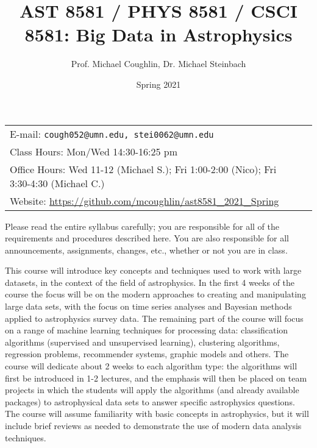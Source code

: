 \documentclass[12pt]{article}
\title{AST 8581 / PHYS 8581 / CSCI 8581: Big Data in Astrophysics}
\author{Prof. Michael Coughlin, Dr. Michael Steinbach}
\date{Spring 2021}
\newcommand{\blankline}{\quad\pagebreak[2]}
\begin{document}
\maketitle

\blankline



\begin{tabular*}{.90\textwidth}{lr}  %


E-mail: \texttt{cough052@umn.edu, stei0062@umn.edu} & \\ 
 Class Hours: Mon/Wed 14:30-16:25 pm \\
 Office Hours: Wed 11-12 (Michael S.); Fri 1:00-2:00 (Nico); Fri 3:30-4:30 (Michael C.) \\
 Website: \url{https://github.com/mcoughlin/ast8581_2021_Spring}

&  \\
\hline
\end{tabular*}

\vspace{5 mm}

\setlength{\parindent}{2em}
\setlength{\parskip}{0.6em}
\renewcommand{\baselinestretch}{1.2}


Please read the entire syllabus carefully; you are responsible for all of the requirements and procedures described here. You are also responsible for all announcements, assignments, changes, etc., whether or not you are in class. 

This course will introduce key concepts and techniques used to work with large datasets, in the
context of the field of astrophysics. In the first 4 weeks of the course the focus will be on the modern approaches to creating and manipulating large data sets, with the focus on time series analyses and Bayesian methods applied to astrophysics survey data. The remaining part of the course will focus on a range of machine learning techniques for processing data: classification algorithms (supervised and unsupervised learning), clustering algorithms, regression problems, recommender systems, graphic models and others. The course will dedicate about 2 weeks to each algorithm type: the algorithms will first be introduced in 1-2 lectures, and the emphasis will then be placed on team projects in which the students will apply the algorithms (and already available packages) to astrophysical data sets to answer specific astrophysics questions. The course will assume familiarity with basic concepts in astrophysics, but it will include brief reviews as needed to demonstrate the use of modern data analysis techniques.
\end{document}

